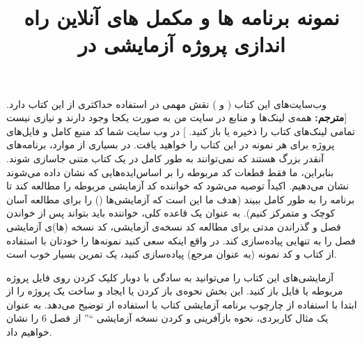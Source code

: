\title{
    \LARGE
    \textbf{نمونه برنامه ها و مکمل های آنلاین}
} \rullFillWithLine[0.5em]{1pt}
\textbf{\vspace{12pt}}

{
    \Large
    \begin{spacing}{1.5}
        وب‌سایت‌های این کتاب (\href{www.d3dcoder.net}{} و \href{www.merclearning.com}{}) نقش مهمی در استفاده حداکثری از این کتاب دارد. [\textbf{مترجم:} همه‌ی لینک‌ها و منابع در سایت من به صورت یکجا وجود دارند و نیازی نیست تمامی لینک‌های کتاب را ذخیره یا باز کنید. ]
        در وب سایت شما کد منبع کامل و فایل‌های پروژه برای هر نمونه در این کتاب را خواهید یافت.
        در بسیاری از موارد، برنامه‌های  آنقدر بزرگ هستند که نمی‌توانند به طور کامل در یک کتاب متنی جاسازی شوند. بنابراین، ما فقط قطعات کد مربوطه را بر اساس‌ایده‌هایی که نشان داده می‌شوند نشان می‌دهیم.
        اکیداً توصیه می‌شود که خواننده کد آزمایشی مربوطه را مطالعه کند تا برنامه را به طور کامل ببیند (هدف ما این است که آزمایشی‌ها () را برای مطالعه آسان کوچک و متمرکز کنیم). به عنوان یک قاعده کلی، خواننده باید بتواند پس از خواندن فصل و گذراندن مدتی برای مطالعه کد نسخه‌ی آزمایشی، کد نسخه (ها)ی آزمایشی فصل را به تنهایی پیاده‌سازی کند.
        در واقع اینکه سعی کنید نمونه‌ها را خودتان با استفاده از کتاب و کد نمونه (به عنوان مرجع) پیاده‌سازی کنید، یک تمرین بسیار خوب است.
    \end{spacing}
}
\textbf{\vspace{25pt}}
\newpage

\title{
    \LARGE
    \textbf{راه اندازی پروژه آزمایشی در }
} \rullFillWithLine[0.5em]{1pt}
\textbf{\vspace{12pt}}

{
    \Large
    \begin{spacing}{1.5}
        آزمایشی‌های این کتاب را می‌توانید به سادگی با دوبار کلیک کردن روی فایل پروژه مربوطه  یا فایل  باز کنید.
        این بخش نحوه‌ی باز کردن یا ایجاد و ساخت یک پروژه را از ابتدا با استفاده از چارچوب برنامه آزمایشی کتاب با استفاده از  توضیح می‌دهد.
        به عنوان یک مثال کاربردی، نحوه بازآفرینی و  کردن نسخه آزمایشی \enquote{} از فصل 6 را نشان خواهیم داد.
    \end{spacing}
}
\textbf{\vspace{25pt}}

\title{
    \Large
}
\textbf{\vspace{-10pt}}

